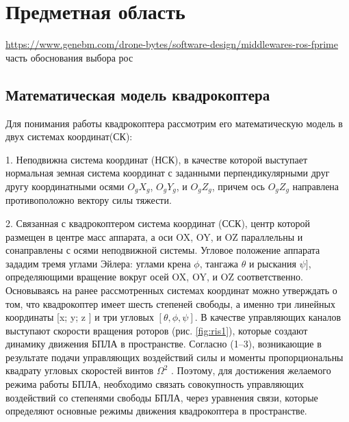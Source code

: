 
\section{Предметная область}

\url{https://www.genebm.com/drone-bytes/software-design/middlewares-ros-fprime} часть обоснования выбора рос

\subsection{Математическая модель квадрокоптера}
Для понимания работы квадрокоптера рассмотрим его математическую модель в двух системах координат(СК):

1. Неподвижна система координат (НСК), в качестве которой выступает нормальная земная система координат с заданными перпендикулярными друг другу координатными осями \(O_{g}X_{g}\), \(O_{g}Y_{g}\), и \(O_{g}Z_{g}\), причем ось \(O_{g}Z_{g}\) направлена противоположно вектору силы тяжести.

2. Связанная с квадрокоптером система координат (ССК), центр которой размещен в центре масс аппарата, а оси OX, OY, и OZ параллельны и сонаправлены с осями неподвижной системы. Угловое положение аппарата зададим тремя углами Эйлера: углами крена \(\phi\), тангажа \(\theta\) и рыскания \(\psi]\), определяющими вращение вокруг осей OX, OY, и OZ соответственно. Основываясь на ранее рассмотренных системах координат можно утверждать о том, что квадрокоптер имеет шесть степеней свободы, а именно три линейных координаты [x; y; z ] и три угловых \([\theta, \phi, \psi]\). В качестве управляющих каналов выступают скорости вращения роторов (рис. \ref{fig:ris1}), которые создают динамику движения БПЛА в пространстве. Согласно (1–3), возникающие в результате подачи управляющих воздействий силы и моменты пропорциональны квадрату угловых скоростей винтов \(\Omega^2\) . Поэтому, для достижения желаемого режима работы БПЛА, необходимо связать совокупность управляющих воздействий со степенями свободы БПЛА, через уравнения связи, которые определяют основные режимы движения квадрокоптера в пространстве.

